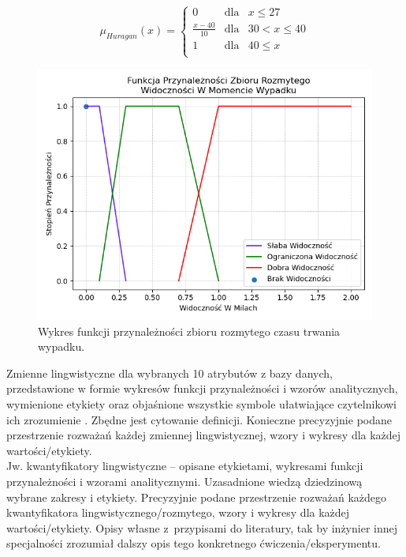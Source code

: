 \documentclass{classrep}
\begin{document}
\begin{equation}
\mu _{Huragan}(x) =  \left\{ \begin{array}{rcl}
 0 & \mbox{dla} & x \leq 27 \\
\frac{x - 40}{10} & \mbox{dla} & 30 < x \leq 40\\
1 & \mbox{dla} & 40 \leq x\\
\end{array}\right.
\end{equation}

\begin{figure}[h!]
 \centering
 \includegraphics[width=14cm]{FunkcjaPrzynaleznosciWidocznosc.png}
 \vspace{-0.3cm}
 \caption{Wykres funkcji przynależności zbioru rozmytego czasu trwania wypadku. }
 \label{rysunek do eksperymentu 1 wariantu 1}
\end{figure}
\newpage




Zmienne lingwistyczne dla wybranych 10 atrybutów z bazy danych, przedstawione w
formie wykresów funkcji przynależności i wzorów analitycznych, wymienione etykiety oraz objaśnione wszystkie
symbole ułatwiające czytelnikowi ich zrozumienie \cite{zadrozny06}. Zbędne jest
cytowanie definicji. Konieczne precyzyjnie podane przestrzenie rozważań każdej
zmiennej lingwistycznej, wzory i wykresy dla każdej wartości/etykiety.\\
Jw. kwantyfikatory lingwistyczne -- opisane etykietami, wykresami funkcji
przynależności i wzorami analitycznymi. Uzasadnione wiedzą dziedzinową wybrane
zakresy i etykiety. Precyzyjnie podane przestrzenie rozważań każdego kwantyfikatora 
lingwistycznego/rozmytego, wzory i wykresy dla każdej wartości/etykiety. Opisy własne z~przypisami do literatury, tak by inżynier innej specjalności zrozumiał dalszy
opis tego konkretnego ćwiczenia/eksperymentu. \\ 
\end{document}
